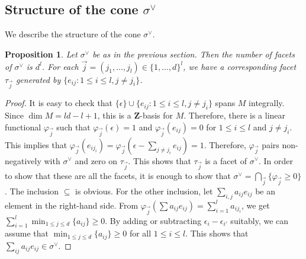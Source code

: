 \documentclass[letterpaper,11pt]{amsart}
\theoremstyle{plain}
\newtheorem{prop}[theo]{Proposition}
\theoremstyle{definition}
\theoremstyle{remark}
\newcommand{\eps}{\epsilon}
\newcommand{\ZZ}{\mathbf{Z}}
\newcommand{\dual}{^{\vee}}
\begin{document}
    \subsection{Structure of the cone $\sigma\dual$} We describe the structure of the cone $\sigma\dual$.
    \begin{prop} \label{prop:structure-of-sigma-dual}
        Let $\sigma\dual$ be as in the previous section. Then the number of facets of $\sigma\dual$ is $d^{l}$. For each $\vec{j} = (j_{1},\ldots, j_{l}) \in \{1,\ldots, d\}^{l}$, we have a corresponding facet $\tau_{\vec{j}}$ generated by $\{ e_{ij} : 1 \leq i \leq l , j \neq j_{i}\}$.
    \end{prop}
    \begin{proof}
        It is easy to check that $\{ \eps \} \cup \{ e_{ij} : 1 \leq i \leq l , j \neq j_{i}\}$ spans $M$ integrally. Since $\dim M = ld - l + 1$, this is a $\ZZ$-basis for $M$. Therefore, there is a linear functional $\varphi_{\vec{j}}$ such that $\varphi_{\vec{j}}(\eps) = 1$ and $\varphi_{\vec{j}}(e_{ij}) = 0$ for $1 \leq i \leq l$ and $j \neq j_{i}$. This implies that $\varphi_{\vec{j}}(e_{ij_{i}}) = \varphi_{\vec{j}}(\eps - \sum_{j \neq j_{i}}e_{ij}) = 1$. Therefore, $\varphi_{\vec{j}}$ pairs non-negatively with $\sigma\dual$ and zero on $\tau_{\vec{j}}$. This shows that $\tau_{\vec{j}}$ is a facet of $\sigma\dual$. In order to show that these are all the facets, it is enough to show that $ \sigma\dual = \bigcap_{\vec{j}} \{ \varphi_{\vec{j}} \geq 0\}$. The inclusion $\subseteq$ is obvious. For the other inclusion, let $\sum_{i,j} a_{ij} e_{ij}$ be an element in the right-hand side. From $\varphi_{\vec{j}}(\sum a_{ij} e_{ij}) = \sum_{i=1}^{l} a_{ij_{i}}$, we get $\sum_{i=1}^{l} \min_{1 \leq j \leq d} \{ a_{ij}\} \geq 0$. By adding or subtracting $\eps_{i} - \eps_{i'}$ suitably, we can assume that $\min_{1 \leq j \leq d} \{ a_{ij} \} \geq 0$ for all $1 \leq i \leq l$. This shows that $\sum_{ij} a_{ij} e_{ij} \in \sigma\dual$.
    \end{proof}
\end{document}
